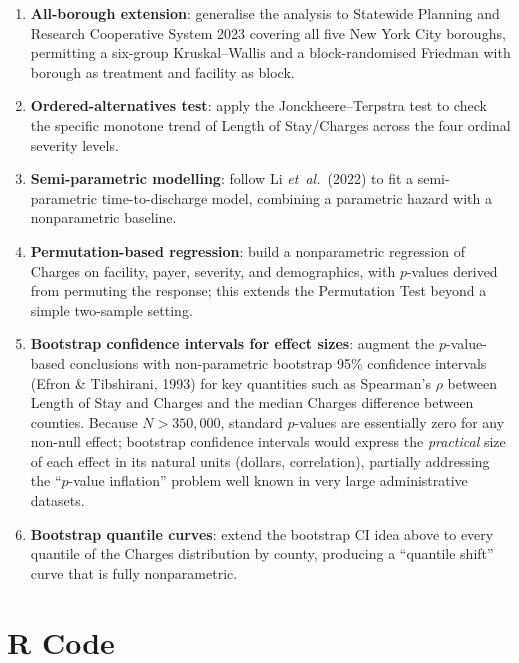 \documentclass[12pt]{article}
\begin{document}
\begin{enumerate}[nosep]
  \item \textbf{All-borough extension}: generalise the analysis to
    Statewide Planning and Research Cooperative System 2023 covering all five New York City boroughs, permitting a
    six-group Kruskal--Wallis and a block-randomised Friedman with
    borough as treatment and facility as block.
  \item \textbf{Ordered-alternatives test}: apply the
    Jonckheere--Terpstra test to check the specific monotone trend of
    Length of Stay/Charges across the four ordinal severity levels.
  \item \textbf{Semi-parametric modelling}: follow Li \emph{et~al.}\
    (2022) to fit a semi-parametric time-to-discharge model,
    combining a parametric hazard with a nonparametric baseline.
  \item \textbf{Permutation-based regression}: build a nonparametric
    regression of Charges on facility, payer, severity, and
    demographics, with $p$-values derived from permuting the
    response; this extends the Permutation Test beyond a simple
    two-sample setting.
  \item \textbf{Bootstrap confidence intervals for effect sizes}:
    augment the $p$-value-based conclusions with non-parametric
    bootstrap 95\% confidence intervals (Efron \& Tibshirani, 1993) for key quantities
    such as Spearman's $\rho$ between Length of Stay and Charges and the median
    Charges difference between counties. Because $N>350{,}000$,
    standard $p$-values are essentially zero for any non-null effect;
    bootstrap confidence intervals would express the \emph{practical} size of each
    effect in its natural units (dollars, correlation), partially
    addressing the ``$p$-value inflation'' problem well known in very
    large administrative datasets.
  \item \textbf{Bootstrap quantile curves}: extend the bootstrap CI
    idea above to every quantile of the Charges distribution by
    county, producing a ``quantile shift'' curve that is fully
    nonparametric.
\end{enumerate}

\section{R Code}
\end{document}
